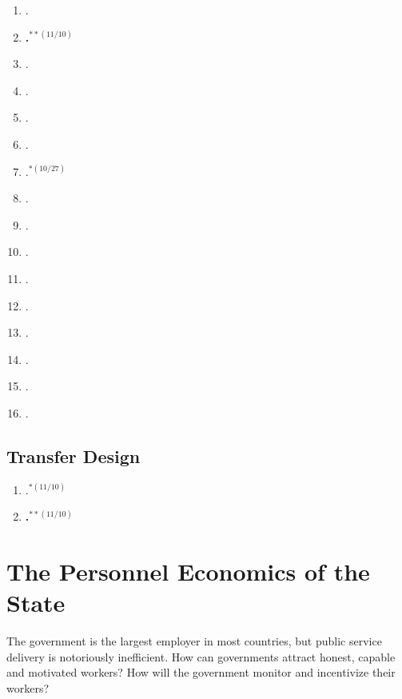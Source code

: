 \documentclass[11pt]{article}
\begin{document}
\begin{enumerate}
\item {}.
\item \textbf{.$^{**(11/10)}$}
\item {}.
\item {}.
\item {}.
\item {}.
\item {}.$^{*(10/27)}$
\item {}.
\item {}.
\item {}.
\item {}.
\item {}.
\item {}.
\item {}.
\item {}.
\item {}.
\end{enumerate}

\subsection{Transfer Design}

\begin{enumerate}
\item {}.$^{*(11/10)}$
\item \textbf{.$^{**(11/10)}$}
\end{enumerate}

\section{The Personnel Economics of the State}
The government is the largest employer in most countries, but public service delivery is notoriously inefficient. How can governments attract honest, capable and motivated workers? How will the government monitor and incentivize their workers?

\end{document}
